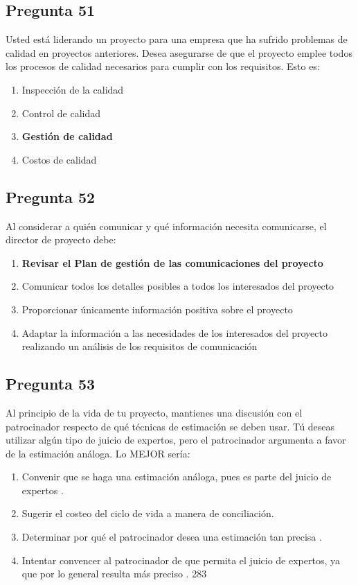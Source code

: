 \documentclass[11pt,a4paper]{article}
\begin{document}
\subsection*{Pregunta 51}
Usted está liderando un proyecto para una empresa que ha sufrido problemas de calidad en proyectos anteriores. Desea asegurarse de que el proyecto emplee todos los procesos de calidad necesarios para cumplir con los requisitos. Esto es:

\begin{enumerate}[label=\alph*)]
  \item Inspección de la calidad
  \item Control de calidad
  \item \textbf{Gestión de calidad}
  \item Costos de calidad
\end{enumerate}

\subsection*{Pregunta 52}
Al considerar a quién comunicar y qué información necesita comunicarse, el director de proyecto debe:

\begin{enumerate}[label=\alph*)]
  \item \textbf{Revisar el Plan de gestión de las comunicaciones del proyecto}
  \item Comunicar todos los detalles posibles a todos los interesados del proyecto
  \item Proporcionar únicamente información positiva sobre el proyecto
  \item Adaptar la información a las necesidades de los interesados del proyecto realizando un análisis de los requisitos de comunicación
\end{enumerate}

\subsection*{Pregunta 53}
Al principio de la vida de tu proyecto, mantienes una discusión con el patrocinador respecto de qué técnicas de estimación se deben usar. Tú deseas utilizar algún tipo de juicio de expertos, pero el patrocinador argumenta a favor de la estimación análoga. Lo MEJOR sería:

\begin{enumerate}[label=\alph*)]
  \item Convenir que se haga una estimación análoga, pues es parte del juicio de expertos .
  \item Sugerir el costeo del ciclo de vida a manera de conciliación.
  \item Determinar por qué el patrocinador desea una estimación tan precisa .
  \item Intentar convencer al patrocinador de que permita el juicio de expertos, ya que por lo general resulta más preciso . 283
\end{enumerate}
\end{document}
